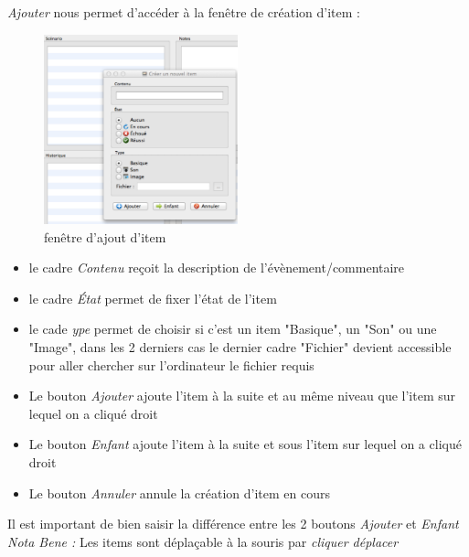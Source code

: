\documentclass[12pt]{article}
\begin{document}
\emph{Ajouter} nous permet d'accéder à la fenêtre de création d'item :
\begin{figure}[h]
    \includegraphics[width=0.5\textwidth]{screen_add_item}
    \caption{fenêtre d'ajout d'item}
\end{figure}
\begin{itemize}
    \item le cadre \emph{Contenu} reçoit la description de l'évènement/commentaire
    \item le cadre \emph{État} permet de fixer l'état de l'item
    \item le cade \emph{ype} permet de choisir si c'est un item "Basique", un "Son" ou une "Image", dans les 2 derniers cas le dernier cadre "Fichier" devient accessible pour aller chercher sur l'ordinateur le fichier requis
    \item Le bouton \emph{Ajouter} ajoute l'item à la suite et au même niveau que l'item sur lequel on a cliqué droit
    \item Le bouton \emph{Enfant} ajoute l'item à la suite et sous l'item sur lequel on a cliqué droit
    \item Le bouton \emph{Annuler} annule la création d'item en cours
\end{itemize}

Il est important de bien saisir la différence entre les 2 boutons \emph{Ajouter} et \emph{Enfant}
\emph{Nota Bene :} Les items sont déplaçable à la souris par \emph{cliquer déplacer}
\end{document}
